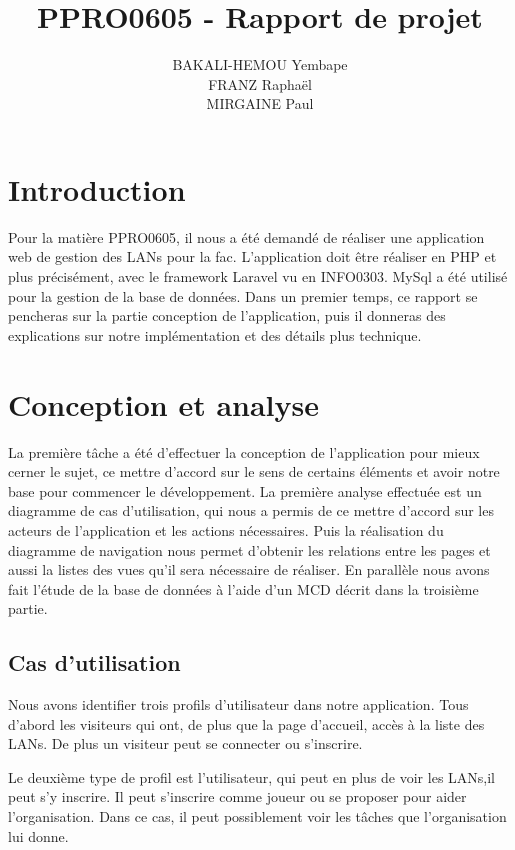 \documentclass[12pt]{article}
\title{\textbf{PPRO0605 - Rapport de projet}}
\author{
		BAKALI-HEMOU Yembape\\
		FRANZ Raphaël\\
		MIRGAINE Paul
		}
\date{}
\begin{document}
\maketitle

\section*{Introduction}

Pour la matière PPRO0605, il nous a été demandé de réaliser une application web de gestion des LANs pour la fac. L'application doit être réaliser en PHP et plus précisément, avec le framework Laravel vu en INFO0303. MySql a été utilisé pour la gestion de la base de données. Dans un premier temps, ce rapport se pencheras sur la partie conception de l'application, puis il donneras des explications sur notre implémentation et des détails plus technique.

\tableofcontents

\newpage

\section{Conception et analyse}
La première tâche a été d'effectuer la conception de l'application pour mieux cerner le sujet, ce mettre d'accord sur le sens de certains éléments et avoir notre base pour commencer le développement. La première analyse effectuée est un diagramme de cas d'utilisation, qui nous a permis de ce mettre d'accord sur les acteurs de l'application et les actions nécessaires. Puis la réalisation du diagramme de navigation nous permet d'obtenir les relations entre les pages et aussi la listes des vues qu'il sera nécessaire de réaliser. En parallèle nous avons fait l'étude de la base de données à l'aide d'un MCD décrit dans la troisième partie.
\subsection{Cas d'utilisation}

Nous avons identifier trois profils d'utilisateur dans notre application. Tous d'abord les visiteurs qui ont, de plus que la page d'accueil, accès à la liste des LANs. De plus un visiteur peut se connecter ou s'inscrire. 
\newline

Le deuxième type de profil est l'utilisateur, qui peut en plus de voir les LANs,il peut s'y inscrire. Il peut s'inscrire comme joueur ou se proposer pour aider l'organisation. Dans ce cas, il peut possiblement voir les tâches que l'organisation lui donne. 
\newline
\end{document}
